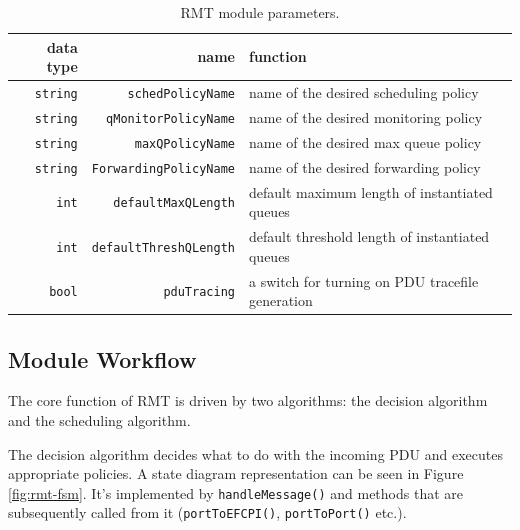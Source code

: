             \begin{table}[H]
                \begin{center}
                  \begin{tabular}{ | r | r | l | }
                    \hline
                    data type & name & function \\
                    \hline
                    \texttt{string} & \texttt{schedPolicyName} & name of the desired scheduling policy \\
                    \texttt{string} & \texttt{qMonitorPolicyName} & name of the desired monitoring policy \\
                    \texttt{string} & \texttt{maxQPolicyName} & name of the desired max queue policy \\
                    \texttt{string} & \texttt{ForwardingPolicyName} & name of the desired forwarding policy \\
                    \texttt{int} & \texttt{defaultMaxQLength} & default maximum length of instantiated queues \\
                    \texttt{int} & \texttt{defaultThreshQLength} & default threshold length of instantiated queues \\
                    \texttt{bool} & \texttt{pduTracing} & a switch for turning on PDU tracefile generation \\
                    \hline
                  \end{tabular}
                  \caption{RMT module parameters.}
                  \label{fig:rmt_params}
                \end{center}
            \end{table}

        \subsection{Module Workflow}

            The core function of RMT is driven by two algorithms: the decision algorithm and the scheduling algorithm.

            The decision algorithm decides what to do with the incoming PDU and executes appropriate policies. A state diagram representation can be seen in Figure \ref{fig:rmt-fsm}. It's implemented by \texttt{handleMessage()} and methods that are subsequently called from it (\texttt{portToEFCPI()}, \texttt{portToPort()} etc.).

